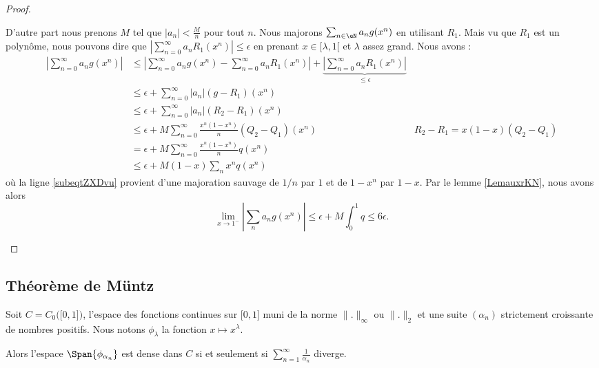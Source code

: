 \begin{proof}
\begin{subproof}
        D'autre part nous prenons \( M\) tel que \( | a_n |<\frac{ M }{ n }\) pour tout \( n\). Nous majorons \( \sum_{n \in \eN}a_ng(x^n)\) en utilisant \( R_1\). Mais vu que \( R_1\) est un polynôme, nous pouvons dire que \( | \sum_{n=0}^{\infty}a_nR_1(x^n) |\leq \epsilon\) en prenant \( x\in\mathopen[ \lambda , 1 [\) et \( \lambda\) assez grand. Nous avons :
        \begin{subequations}
            \begin{align}
                \left| \sum_{n=0}^{\infty}a_ng(x^n) \right| &\leq\left| \sum_{n=0}^{\infty}a_ng(x^n)-\sum_{n=0}^{\infty}a_nR_1(x^n) \right| +\underbrace{\left| \sum_{n=0}^{\infty}a_nR_1(x^n) \right|}_{\leq \epsilon} \\
                &\leq \epsilon+\sum_{n=0}^{\infty}| a_n |(g-R_1)(x^n)\\
                &\leq \epsilon+\sum_{n=0}^{\infty}| a_n |(R_2-R_1)(x^n)\\
                &\leq \epsilon+M\sum_{n=0}^{\infty}\frac{ x^n(1-x^n) }{ n }(Q_2-Q_1)(x^n)   &R_2-R_1=x(1-x)(Q_2-Q_1)\\
                &=\epsilon+M\sum_{n=0}^{\infty}\frac{ x^n(1-x^n) }{ n }q(x^n)\\
                &\leq \epsilon+M(1-x)\sum_nx^nq(x^n)   \label{subeqtZXDvu} 
            \end{align}
        \end{subequations}
        où la ligne \eqref{subeqtZXDvu} provient d'une majoration sauvage de \( 1/n\) par \( 1\) et de \( 1-x^n\) par \( 1-x\). Par le lemme \ref{LemauxrKN}, nous avons alors
        \begin{equation}
            \lim_{x\to 1^-} | \sum_na_ng(x^n) |\leq \epsilon+M\int_0^1q\leq 6\epsilon.
        \end{equation}
    \end{subproof}
\end{proof}

\subsection{Théorème de Müntz}

\begin{theorem}
    Soit \( C=C_0\big( \mathopen[ 0 , 1 \mathclose] \big)\), l'espace des fonctions continues sur \( \mathopen[ 0 , 1 \mathclose]\) muni de la norme \( \| . \|_{\infty}\) ou \( \| . \|_2\) et une suite \( (\alpha_n)\) strictement croissante de nombres positifs. Nous notons \( \phi_{\lambda}\) la fonction \( x\mapsto x^{\lambda}\).

    Alors l'espace \( \Span\{ \phi_{\alpha_n} \}\) est dense dans \( C\) si et seulement si \( \sum_{n=1}^{\infty}\frac{1}{ \alpha_n }\) diverge.
\end{theorem}

